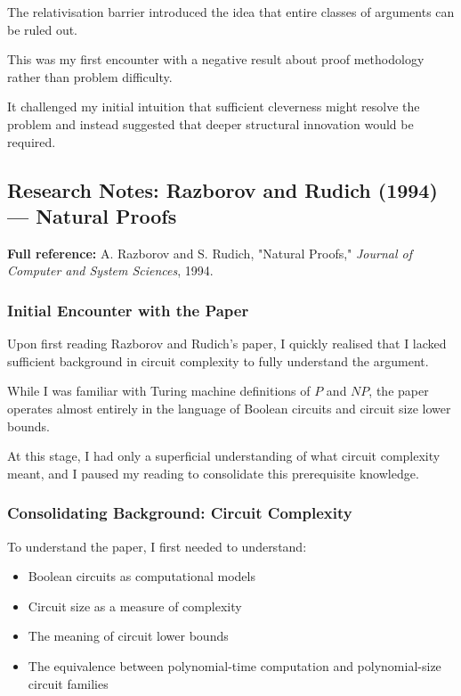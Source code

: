 \documentclass[12pt]{article}
\begin{document}
The relativisation barrier introduced the idea that entire classes of arguments can be ruled out.

This was my first encounter with a negative result about proof methodology rather than problem difficulty.

It challenged my initial intuition that sufficient cleverness might resolve the problem and instead suggested that deeper structural innovation would be required.

\subsection{Research Notes: Razborov and Rudich (1994) --- Natural Proofs}

\textbf{Full reference:} A. Razborov and S. Rudich, 
"Natural Proofs," 
\textit{Journal of Computer and System Sciences}, 1994.

\subsubsection*{Initial Encounter with the Paper}

Upon first reading Razborov and Rudich's paper, I quickly realised that I lacked sufficient background in circuit complexity to fully understand the argument.

While I was familiar with Turing machine definitions of $P$ and $NP$, the paper operates almost entirely in the language of Boolean circuits and circuit size lower bounds.

At this stage, I had only a superficial understanding of what circuit complexity meant, and I paused my reading to consolidate this prerequisite knowledge.

\subsubsection*{Consolidating Background: Circuit Complexity}

To understand the paper, I first needed to understand:

\begin{itemize}
\item Boolean circuits as computational models
\item Circuit size as a measure of complexity
\item The meaning of circuit lower bounds
\item The equivalence between polynomial-time computation and polynomial-size circuit families
\end{itemize}
\end{document}
